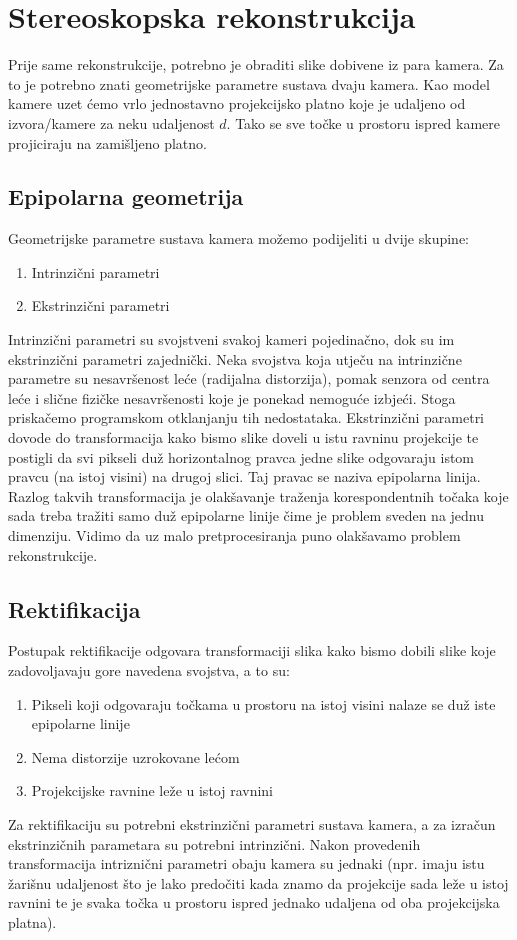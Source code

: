 \documentclass[utf8, zavrsni, numeric]{fer}
\begin{document}
\chapter{Stereoskopska rekonstrukcija}

Prije same rekonstrukcije, potrebno je obraditi slike dobivene iz para kamera. Za to je potrebno znati geometrijske parametre sustava dvaju kamera. Kao model kamere uzet ćemo
vrlo jednostavno projekcijsko platno koje je udaljeno od izvora/kamere za neku udaljenost $d$. Tako se sve točke u prostoru ispred kamere projiciraju na zamišljeno platno.

\section{Epipolarna geometrija}


Geometrijske parametre sustava kamera možemo podijeliti u dvije skupine:
\begin{enumerate}
  \item Intrinzični parametri
  \item Ekstrinzični parametri
\end{enumerate}

Intrinzični parametri su svojstveni svakoj kameri pojedinačno, dok su im ekstrinzični parametri zajednički. Neka svojstva koja utječu na intrinzične parametre su nesavršenost leće (radijalna distorzija), pomak senzora
od centra leće i slične fizičke nesavršenosti koje je ponekad nemoguće izbjeći. Stoga priskačemo programskom otklanjanju tih nedostataka.
Ekstrinzični parametri dovode do transformacija kako bismo slike doveli u istu ravninu projekcije te postigli da svi pikseli duž horizontalnog pravca jedne slike odgovaraju istom pravcu (na istoj visini) na drugoj slici. Taj pravac se naziva epipolarna linija. Razlog takvih transformacija je olakšavanje traženja korespondentnih točaka koje sada treba tražiti samo duž epipolarne linije čime je problem sveden na jednu dimenziju. Vidimo da uz malo pretprocesiranja puno olakšavamo problem rekonstrukcije.

\section{Rektifikacija}
Postupak rektifikacije odgovara transformaciji slika kako bismo dobili slike koje zadovoljavaju gore navedena svojstva, a to su:
\begin{enumerate}
  \item Pikseli koji odgovaraju točkama u prostoru na istoj visini nalaze se duž iste epipolarne linije
  \item Nema distorzije uzrokovane lećom
  \item Projekcijske ravnine leže u istoj ravnini
\end{enumerate}
Za rektifikaciju su potrebni ekstrinzični parametri sustava kamera, a za izračun ekstrinzičnih parametara su potrebni intrinzični.
Nakon provedenih transformacija intriznični parametri obaju kamera su jednaki (npr. imaju istu žarišnu udaljenost što je lako predočiti kada znamo da projekcije sada leže u istoj ravnini te je svaka točka
u prostoru ispred jednako udaljena od oba projekcijska platna).
\end{document}
